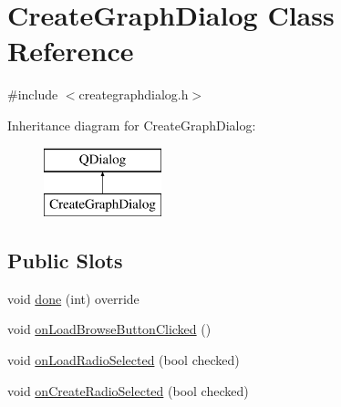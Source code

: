 \hypertarget{class_create_graph_dialog}{}\section{Create\+Graph\+Dialog Class Reference}
\label{class_create_graph_dialog}


{\ttfamily \#include $<$creategraphdialog.\+h$>$}

Inheritance diagram for Create\+Graph\+Dialog\+:\begin{figure}[H]
\begin{center}
\leavevmode
\includegraphics[height=2.000000cm]{db/d15/class_create_graph_dialog}
\end{center}
\end{figure}
\subsection*{Public Slots}
\begin{DoxyCompactItemize}
\item 
void \mbox{\hyperlink{class_create_graph_dialog_a89d25fc3ce950a3e5e12f938f7816f3d}{done}} (int) override
\item 
void \mbox{\hyperlink{class_create_graph_dialog_ad9aad6e0ec522de0581a08f4b8e6ab89}{on\+Load\+Browse\+Button\+Clicked}} ()
\item 
void \mbox{\hyperlink{class_create_graph_dialog_adaf09d06650caff2d61a2aa270c9a0d5}{on\+Load\+Radio\+Selected}} (bool checked)
\item 
void \mbox{\hyperlink{class_create_graph_dialog_afd3f5fd3f6213a3b6ffc75cb72533f57}{on\+Create\+Radio\+Selected}} (bool checked)
\end{DoxyCompactItemize}
